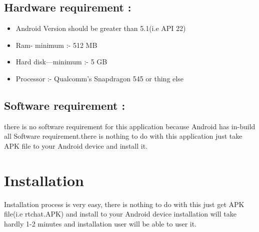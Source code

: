 \begin{appendices}
\subsection{Hardware requirement :}
\begin{itemize}
	\item Android Version should be greater than 5.1(i.e API 22)
	\item Ram- minimum :- 512 MB
	\item Hard disk—minimum :- 5 GB 
	\item Processor :- Qualcomm's Snapdragon 545 or thing else
	
\end{itemize}

\subsection{Software requirement :}
there is no software requirement for this application because Android has in-build all Software requirement.there is nothing to do with this application just take APK file to your Android device and install it.

\section{Installation} 
Installation process is very easy, there is nothing to do with this just get APK file(i.e rtchat.APK) and install to your Android device installation will take hardly 1-2 minutes and installation user will be able to user it.



\end{appendices}